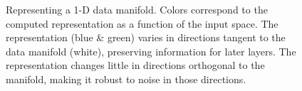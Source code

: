 \begin{figure}[h]
\centering
\caption[Desirable properties of representations of manifolds]
{Representing a 1-D data manifold.
Colors correspond to the computed representation as a function of the input space.
The representation (blue \& green) varies in directions tangent to the data manifold (white), preserving information for later layers. 
The representation changes little in directions orthogonal to the manifold, making it robust to noise in those directions.
}
\label{fig:hidden}
\end{figure}

